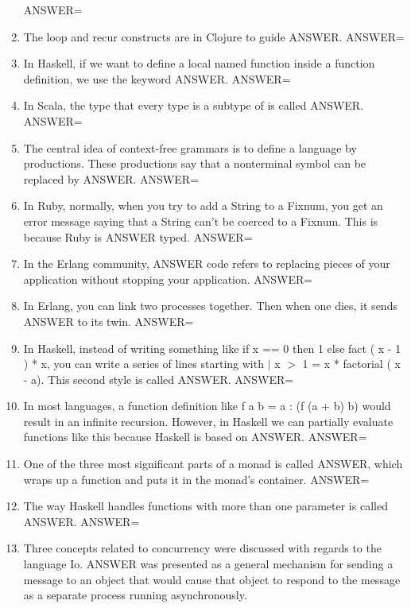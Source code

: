 \documentclass{exam}
\begin{document}
\begin{enumerate}
ANSWER=
\item The loop and recur constructs are in Clojure to guide ANSWER.\newline
ANSWER=
\item In Haskell, if we want to define a local named function inside a function definition, we use the keyword ANSWER.\newline
ANSWER=
\item In Scala, the type that every type is a subtype of is called ANSWER.\newline
ANSWER=
\item The central idea of context-free grammars is to define a language by productions.  These productions say that a nonterminal symbol can be replaced by ANSWER.\newline
ANSWER=
\item In Ruby, normally, when you try to add a String to a Fixnum, you get an error message saying that a String can't be coerced to a Fixnum.  This is because Ruby is ANSWER typed.\newline
ANSWER=
\item In the Erlang community, ANSWER code refers to replacing pieces of your application without stopping your application.\newline
ANSWER=
\item In Erlang, you can link two processes together.  Then when one dies, it sends ANSWER to its twin.\newline
ANSWER=
\item In Haskell, instead of writing something like if x == 0 then 1 else fact ( x - 1 ) * x, you can write a series of lines starting with $|$ x $>$ 1 = x * factorial ( x - a).  This second style is called ANSWER.\newline
ANSWER=
\item In most languages, a function definition like f a b = a : (f (a + b) b) would result in an infinite recursion.  However, in Haskell we can partially evaluate functions like this because Haskell is based on ANSWER.\newline
ANSWER=
\item One of the three most significant parts of a monad is called ANSWER, which wraps up a function and puts it in the monad's container.\newline
ANSWER=
\item The way Haskell handles functions with more than one parameter is called ANSWER.\newline
ANSWER=
\item Three concepts related to concurrency were discussed with regards to the language Io.  ANSWER was presented as a general mechanism for sending a message to an object that would cause that object to respond to the message as a separate process running asynchronously.\newline

\end{enumerate}
\end{document}

